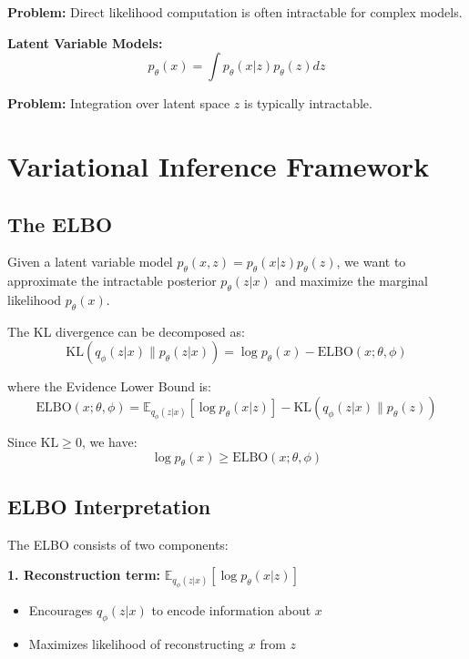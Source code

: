 \textbf{Problem:} Direct likelihood computation is often intractable for complex models.

\textbf{Latent Variable Models:}
\begin{equation}
    p_\theta(x) = \int p_\theta(x|z) p_\theta(z) dz
\end{equation}

\textbf{Problem:} Integration over latent space $z$ is typically intractable.

\section{Variational Inference Framework}

\subsection{The ELBO}

Given a latent variable model $p_\theta(x,z) = p_\theta(x|z)p_\theta(z)$, we want to approximate the intractable posterior $p_\theta(z|x)$ and maximize the marginal likelihood $p_\theta(x)$.

The KL divergence can be decomposed as:
\begin{equation}
    \text{KL}(q_\phi(z|x) \| p_\theta(z|x)) = \log p_\theta(x) - \text{ELBO}(x; \theta, \phi)
\end{equation}

where the Evidence Lower Bound is:
\begin{equation}
    \text{ELBO}(x; \theta, \phi) = \mathbb{E}_{q_\phi(z|x)}[\log p_\theta(x|z)] - \text{KL}(q_\phi(z|x) \| p_\theta(z))
\end{equation}

Since $\text{KL} \geq 0$, we have:
\begin{equation}
    \log p_\theta(x) \geq \text{ELBO}(x; \theta, \phi)
\end{equation}

\subsection{ELBO Interpretation}

The ELBO consists of two components:

\textbf{1. Reconstruction term:} $\mathbb{E}_{q_\phi(z|x)}[\log p_\theta(x|z)]$
\begin{itemize}
    \item Encourages $q_\phi(z|x)$ to encode information about $x$
    \item Maximizes likelihood of reconstructing $x$ from $z$
\end{itemize}

